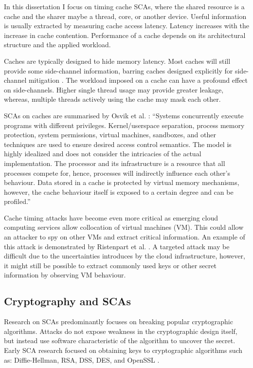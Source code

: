 	In this dissertation I focus on timing cache SCAs, where the shared resource is a cache and the sharer maybe a thread, core, or another device. Useful information is usually extracted by measuring cache access latency. Latency increases with the increase in cache contention. Performance of a cache depends on its architectural structure and the applied workload. 
	
	Caches are typically designed to hide memory latency. Most caches will still provide some side-channel information, barring caches designed explicitly for side-channel mitigation \cite{Liu13}. The workload imposed on a cache can have a profound effect on side-channels. Higher single thread usage may provide greater leakage, whereas, multiple threads actively using the cache may mask each other.
	 
	SCAs on caches are summarised by Osvik et al. \cite{Osvik06}: ``Systems concurrently execute programs with different privileges. Kernel/userspace separation, process memory protection, system permissions, virtual machines, sandboxes, and other techniques are used to ensure desired access control semantics. The model is highly idealized and does not consider the intricacies of the actual implementation.	The processor and its infrastructure is a resource that all processes compete for, hence, processes will indirectly influence each other's behaviour. Data stored in a cache is protected by virtual memory mechanisms, however, the cache behaviour itself is exposed to a certain degree and can be profiled.''
	
	Cache timing attacks have become even more critical as emerging cloud computing services allow collocation of virtual machines (VM). This could allow an attacker to spy on other VMs and extract critical information. An example of this attack is demonstrated by Ristenpart et al. \cite{Ristenpart09}. A targeted attack may be difficult due to the uncertainties introduces by the cloud infrastructure, however, it might still be possible to extract commonly used keys or other secret information by observing VM behaviour.
	
	\subsection{Cryptography and SCAs}
		Research on SCAs predominantly focuses on breaking popular cryptographic algorithms. Attacks do not expose weakness in the cryptographic design itself, but instead use software characteristic of the algorithm to uncover the secret. Early SCA research focused on obtaining keys to cryptographic algorithms such as: Diffie-Hellman, RSA, DSS, DES, and OpenSSL \cite{Kocher96,Tsunoo03,Kelsey98,Brumley03}. 
		
